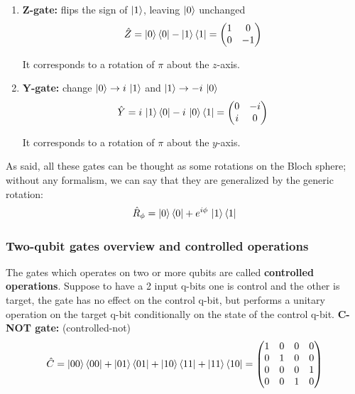 \begin{enumerate}
    It corresponds to a rotation of $\pi$ about the $x$-axis.

    \item \textbf{Z-gate:} flips the sign of $\ket{1}$, leaving $\ket{0}$ unchanged
    \begin{equation}\label{eqn:16-z-gate}
    \hat{Z} = \ket{0}\bra{0}-\ket{1}\bra{1} = \begin{pmatrix}
        1 &0\\0&-1
    \end{pmatrix}
    \end{equation}

    It corresponds to a rotation of $\pi$ about the $z$-axis.

    \item \textbf{Y-gate:} change $\ket{0}\to i\, \ket{1}$ and $\ket{1} \to -i\, \ket{0}$
    \begin{equation}\label{eqn:16-y-gate}
    \hat{Y} = i\, \ket{1}\bra{0}-i\,\ket{0}\bra{1} = \begin{pmatrix}
        0 &-i\\i&0
    \end{pmatrix}
    \end{equation}

    It corresponds to a rotation of $\pi$ about the $y$-axis.
\end{enumerate}

As said, all these gates can be thought as some rotations on the Bloch sphere; without any formalism, we can say that they are generalized by the generic rotation:
\begin{equation}\label{eqn:16-generic-rotation}
    \hat{R}_{\phi} = \ket{0}\bra{0}+e^{i\phi}\, \ket{1}\bra{1}
\end{equation}

\subsubsection{Two-qubit gates overview and controlled operations}

The gates which operates on two or more qubits are called \textbf{controlled operations}. Suppose to have a 2 input q-bits one is control and the other is target, the gate has no effect on the control q-bit, but performs a unitary operation on the target q-bit conditionally on the state of the control q-bit.
\textbf{C-NOT gate:} (controlled-not)
\begin{equation}\label{eqn:16-cnot-gate}
\hat{C} = 
\ket{00}\bra{00} + \ket{01}\bra{01} +
\ket{10}\bra{11} + \ket{11}\bra{10} = 
\begin{pmatrix}
    1&0&0&0\\ 
    0&1&0&0\\
    0&0&0&1\\
    0&0&1&0
\end{pmatrix}
\end{equation}

